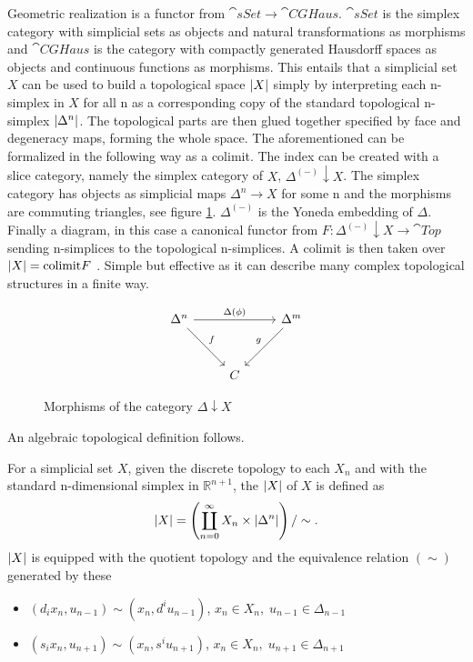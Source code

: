 \documentclass[../../main.tex]{subfiles}
\begin{document}
    Geometric realization is a functor from $\cat{sSet}\to \cat{CGHaus}$. $\cat{sSet}$ is the simplex category with simplicial sets as objects and natural transformations as morphisms and $\cat{CGHaus}$ is the category with compactly generated Hausdorff spaces as objects and continuous functions as morphisms. This entails that a simplicial set $X$ can be used to build a topological space $\geom[X]$ simply by interpreting each n-simplex in $X$ for all n as a corresponding copy of the standard topological n-simplex $\geom[\Delta^n]$. The topological parts are then glued together specified by face and degeneracy maps, forming the whole space. The aforementioned can be formalized in the following way as a colimit. The index can be created with a slice category, namely the simplex category of $X$, $\Delta^{(-)} \downarrow X$. The simplex category has objects as simplicial maps $\Delta^n\to X$ for some n and the morphisms are commuting triangles, see figure \ref{commuting-tri}. $\Delta^{(-)}$ is the Yoneda embedding of $\Delta$. Finally a diagram, in this case a canonical functor from $F:\Delta^{(-)} \downarrow X\to \cat{Top}$ sending n-simplices to the topological n-simplices. A colimit is then taken over $\geom[X]= \text{colimit}F$ \cite{luk-simp}. Simple but effective as it can describe many complex topological structures in a finite way.
    \begin{figure}[H]
        \[
            \begin{tikzcd}[row sep = 3em]
                \Delta^n \arrow[rr,"\Delta(\phi)"] \arrow[dr, "f"] && \Delta^m \arrow[dl,"g", swap] \\
                & C
            \end{tikzcd}
        \]
        \caption{Morphisms of the category $\Delta \downarrow X$}
        \label{commuting-tri}
    \end{figure}
    An algebraic topological definition follows.

    \begin{definition}
        For a simplicial set $X$, given the discrete topology to each $X_n$ and with the standard n-dimensional simplex in $\mathbb{R}^{n+1}$, the  $\geom[X]$ of $X$ is defined as
        \[\geom[X]=\left(\coprod_{n=0}^{\infty} X_n \times \geom[\Delta^n]\right)/\sim.\]
        $\geom[X]$ is equipped with the quotient topology and the equivalence relation $(\sim)$ generated by these 
        \begin{itemize}
            \item $(d_ix_{n},u_{n-1})\sim(x_{n}, d^iu_{n-1})$, $x_n\in X_n,\; u_{n-1} \in \Delta _{n-1}$
            \item $(s_ix_n, u_{n+1})\sim(x_n, s^iu_{n+1})$, $x_n \in X_n,\; u_{n+1}\in \Delta_{n+1}$
        \end{itemize}
    \end{definition}
    
\end{document}
